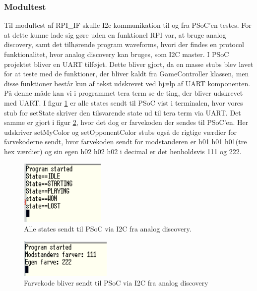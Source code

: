 \documentclass[Rapport/Playerside/RPI_IF/RPI_IF.tex]{subfiles}
\begin{document}
\subsubsection{Modultest}
Til modultest af RPI\_IF skulle I2c kommunikation til og fra PSoC'en testes. For at dette kunne lade sig gøre uden en funktionel RPI var, at bruge analog discovery, samt det tilhørende program waveforms, hvori der findes en protocol funktionalitet, hvor analog discovery kan bruges, som I2C master. I PSoC projektet bliver en UART tilføjet. Dette bliver gjort, da en masse stubs blev lavet for at teste med de funktioner, der bliver kaldt fra GameController klassen, men disse funktioner består kun af tekst udskrevet ved hjælp af UART komponenten. På denne måde kan vi i programmet tera term se de ting, der bliver udskrevet med UART. I figur \ref{fig:state_change} er alle states sendt til PSoC vist i terminalen, hvor vores stub for setState skriver den tilsvarende state ud til tera term via UART. Det samme er gjort i figur \ref{fig:color_change}, hvor det dog er farvekoden der sendes til PSoC'en. Her udskriver setMyColor og setOpponentColor stubs også de rigtige værdier for farvekoderne sendt, hvor farvekoden sendt for modstanderen er h01 h01 h01(tre hex værdier) og sin egen h02 h02 h02 i decimal er det henholdsvis 111 og 222.
\begin{figure}
    \centering 
    \includegraphics[width=0.5\linewidth]{Rapport/Playerside/graphics/RPI_IF/states.PNG}
    \caption{Alle states sendt til PSoC via I2C fra analog discovery.}
    \label{fig:state_change}
\end{figure}
\begin{figure}
    \centering 
    \includegraphics[width=0.5\linewidth]{Rapport/Playerside/graphics/RPI_IF/farvekode.PNG}
    \caption{Farvekode bliver sendt til PSoC via I2C fra analog discovery}
    \label{fig:color_change}
\end{figure}
\end{document}
